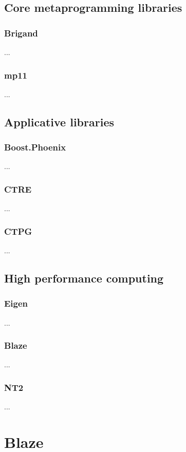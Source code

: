 \documentclass[../../main.tex]{subfiles}
\begin{document}

\section{Core metaprogramming libraries}

\subsection{Brigand} ...

\subsection{mp11} ...

\section{Applicative libraries}

\subsection{Boost.Phoenix} ...

\subsection{CTRE} ...

\subsection{CTPG} ...

\section{High performance computing}

\subsection{Eigen} ...

\subsection{Blaze} ...

\subsection{NT2} ...

\chapter{Blaze}
\end{document}

